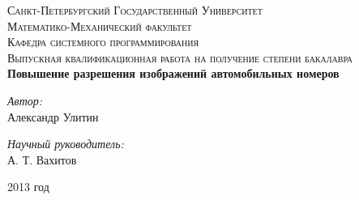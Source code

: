 \newenvironment{changemargin}[2]{
\begin{list}{}{
\setlength{\topsep}{0pt}
\setlength{\leftmargin}{#1}
\setlength{\rightmargin}{#2}
\setlength{\listparindent}{\parindent}
\setlength{\itemindent}{\parindent}
\setlength{\parsep}{\parskip}
}
\item[]}{\end{list}}


\begin{titlepage}
\begin{changemargin}{-2cm}{-0.5cm}

\begin{center}


\textsc{Санкт-Петербургский Государственный Университет \\[0.2cm]
Математико-Механический факультет\\
Кафедра системного программирования\\[1.5cm]}
\textsc{
Выпускная квалификационная работа на получение степени
бакалавра
}\\[2.5cm]

{ \Large \bfseries
Повышение разрешения изображений автомобильных номеров
}
\\[2.5cm]


\begin{minipage}{0.4\textwidth}
\begin{flushleft}
\emph{Автор:}\\
Александр Улитин
\end{flushleft}
\end{minipage}
\begin{minipage}{0.4\textwidth}
\begin{flushright}
\emph{Научный руководитель:} \\
А. Т. Вахитов
\end{flushright}
\end{minipage}

\vfill
{2013 год}

\end{center}

\end{changemargin}
\end{titlepage}
